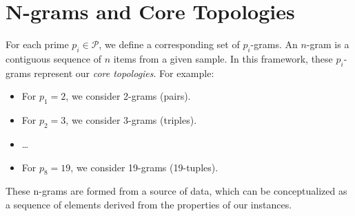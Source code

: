 \section{N-grams and Core Topologies}
For each prime $p_i \in \mathcal{P}$, we define a corresponding set of $p_i$-grams. An $n$-gram is a contiguous sequence of $n$ items from a given sample. In this framework, these $p_i$-grams represent our \textit{core topologies}.
For example:
\begin{itemize}
    
    \item For $p_1 = 2$, we consider 2-grams (pairs).
    
    \item For $p_2 = 3$, we consider 3-grams (triples).
    
    \item \ldots
    
    \item For $p_8 = 19$, we consider 19-grams (19-tuples).
\end{itemize}
These n-grams are formed from a source of data, which can be conceptualized as a sequence of elements derived from the properties of our instances.
